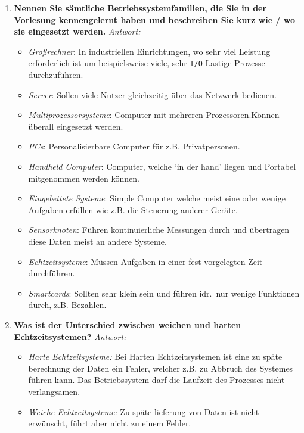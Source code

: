 \begin{enumerate}[label=\arabic*.]
    \item \textbf{Nennen Sie sämtliche Betriebssystemfamilien, die Sie in der Vorlesung kennengelernt
              haben und beschreiben Sie kurz wie / wo sie eingesetzt werden.} \newline
          \textit{Antwort:} \begin{itemize}
              \item \textit{Großrechner}: In industriellen Einrichtungen, wo sehr viel Leistung erforderlich ist
                    um beispielsweise viele, sehr \texttt{I/O}-Lastige Prozesse durchzuführen.
              \item \textit{Server}: Sollen viele Nutzer gleichzeitig über das Netzwerk bedienen.
              \item \textit{Multiprozessorsysteme}: Computer mit mehreren Prozessoren.\newline Können überall eingesetzt werden.
              \item \textit{PCs}: Personalisierbare Computer für z.B. Privatpersonen.
              \item \textit{Handheld Computer}: Computer, welche `in der hand' liegen und Portabel mitgenommen
                    werden können.
              \item \textit{Eingebettete Systeme}: Simple Computer welche meist eine oder wenige Aufgaben erfüllen wie
                    z.B. die Steuerung anderer Geräte.
              \item \textit{Sensorknoten}: Führen kontinuierliche Messungen durch und übertragen diese Daten meist
                    an andere Systeme.
              \item \textit{Echtzeitsysteme}: Müssen Aufgaben in einer fest vorgelegten Zeit durchführen.
              \item \textit{Smartcards}: Sollten sehr klein sein und führen idr.\ nur wenige Funktionen
                    durch, z.B. Bezahlen.
          \end{itemize}

    \item \textbf{Was ist der Unterschied zwischen weichen und harten Echtzeitsystemen?} \newline
          \textit{Antwort:} \begin{itemize}
              \item \textit{Harte Echtzeitsysteme:} Bei Harten Echtzeitsystemen ist eine zu späte
                    berechnung der Daten ein Fehler, welcher z.B. zu Abbruch des Systemes führen kann.
                    Das Betriebssystem darf die Laufzeit des Prozesses nicht verlangsamen.
              \item \textit{Weiche Echtzeitsysteme:} Zu späte lieferung von Daten ist nicht erwünscht,
                    führt aber nicht zu einem Fehler.
          \end{itemize}


\end{enumerate}

